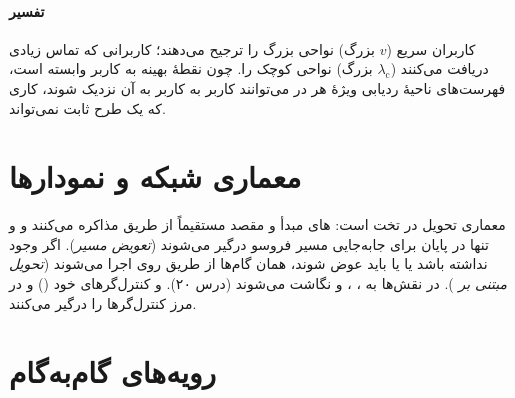 \documentclass[11pt,a4paper]{article}
\begin{document}
\paragraph{تفسیر} کاربران سریع ($v$ بزرگ) نواحی بزرگ را ترجیح می‌دهند؛ کاربرانی که تماس زیادی
دریافت می‌کنند ($\lambda_\mathrm{c}$ بزرگ) نواحی کوچک را. چون نقطهٔ بهینه به کاربر وابسته است، فهرست‌های
ناحیهٔ ردیابی ویژهٔ هر  در  می‌توانند کاربر به کاربر به آن نزدیک شوند، کاری که یک
طرح ثابت  نمی‌تواند.

\begin{acnfigure}
  \caption{هزینهٔ سیگنالینگ به‌روزرسانی، فراخوانی و مجموع در \cref{eq:cost} برای
  $c_\mathrm{u} = 1$، $c_\mathrm{p} = 0.1$، $v = \qty{10}{\metre\per\second}$، $a = \qty{500}{\metre}$ و
  $\lambda_\mathrm{c} = 2$ تماس در ساعت (\cref{ex:la}).}
  \label{fig:lacost}
\end{acnfigure}

\section{معماری شبکه و نمودارها}
معماری تحویل در  تخت است: های مبدأ و مقصد مستقیماً از طریق  مذاکره
می‌کنند و  و  تنها در پایان برای جابه‌جایی مسیر فروسو درگیر می‌شوند (\emph{تعویض
مسیر}). اگر  وجود نداشته باشد یا  یا  باید عوض شوند، همان گام‌ها از طریق
 روی  اجرا می‌شوند (\emph{تحویل مبتنی بر }). در  نقش‌ها به ،
،  و  نگاشت می‌شوند (درس ۲۰).  و  کنترل‌گرهای خود
() و در مرز کنترل‌گرها  را درگیر می‌کنند.

\section{رویه‌های گام‌به‌گام}
\end{document}
